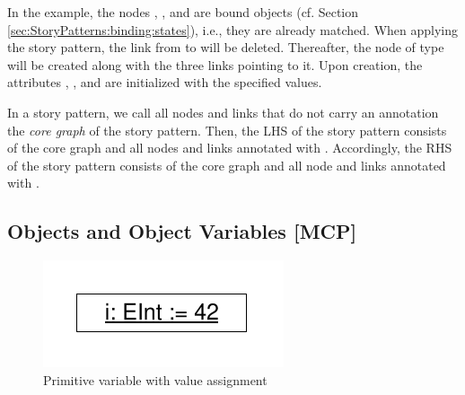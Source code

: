 In the example, the nodes , , and  are bound objects (cf. Section \ref{sec:StoryPatterns:binding:states}), i.e., they are already matched. When applying the story pattern, the link from  to  will be deleted. Thereafter, the node  of type  will be created along with the three links pointing to it. Upon creation, the attributes , , and  are initialized with the specified values.

In a story pattern, we call all nodes and links that do not carry an annotation the \emph{core graph} of the story pattern. Then, the LHS of the story pattern consists of the core graph and all nodes and links annotated with \destroy. Accordingly, the RHS of the story pattern consists of the core graph and all node and links annotated with \create.

\subsection{Objects and Object Variables [MCP]}
\label{sec:StoryPatterns:objects}





\begin{figure}[htbp]
  \centering
  \includegraphics[scale=0.6]{figures/PrimitiveVariable}
  \caption{Primitive variable with value assignment}
  \label{fig:primitiveVariable}
\end{figure}


